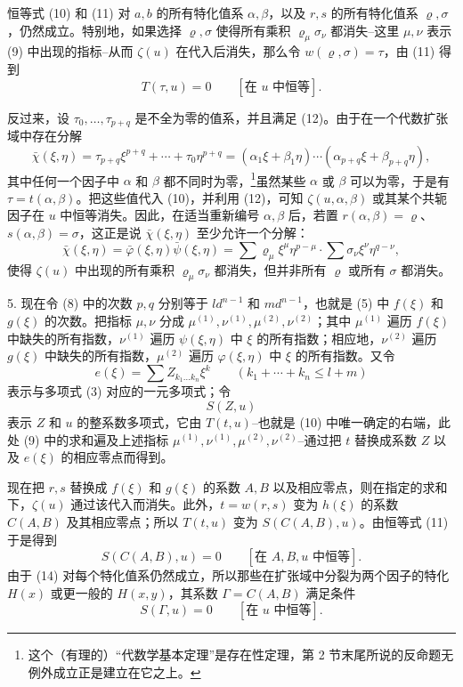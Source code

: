 恒等式 (10) 和 (11) 对 $a,b$ 的所有特化值系 $\alpha,\beta$，以及 $r,s$ 的所有特化值系 $\varrho,\sigma$，仍然成立。特别地，如果选择 $\varrho,\sigma$ 使得所有乘积 $\varrho_\mu\sigma_\nu$ 都消失--这里 $\mu,\nu$ 表示 (9) 中出现的指标--从而 $\zeta(u)$ 在代入后消失，那么令 $w(\varrho,\sigma)=\tau$，由 (11) 得到
\begin{equation}
 T(\tau,u)=0\qquad[\text{在 }u\text{ 中恒等}].
\tag{12}
\end{equation}

反过来，设 $\tau_0,\ldots,\tau_{p+q}$ 是不全为零的值系，并且满足 (12)。由于在一个代数扩张域中存在分解
\begin{equation}
 \bar\chi(\xi,\eta)=\tau_{p+q}\xi^{p+q}+\cdots+\tau_0\eta^{p+q}
=(\alpha_1\xi+\beta_1\eta)\cdots(\alpha_{p+q}\xi+\beta_{p+q}\eta),
\tag{12'}
\end{equation}
其中任何一个因子中 $\alpha$ 和 $\beta$ 都不同时为零，\footnote{这个（有理的）“代数学基本定理”是存在性定理，第 2 节末尾所说的反命题无例外成立正是建立在它之上。}虽然某些 $\alpha$ 或 $\beta$ 可以为零，于是有 $\tau=t(\alpha,\beta)$。把这些值代入 (10)，并利用 (12)，可知 $\zeta(u,\alpha,\beta)$ 或其某个共轭因子在 $u$ 中恒等消失。因此，在适当重新编号 $\alpha,\beta$ 后，若置 $r(\alpha,\beta)=\varrho$、$s(\alpha,\beta)=\sigma$，这正是说 $\bar\chi(\xi,\eta)$ 至少允许一个分解：
\begin{equation}
\bar\chi(\xi,\eta)=\bar\varphi(\xi,\eta)\bar\psi(\xi,\eta)
=\sum \varrho_\mu\xi^\mu\eta^{p-\mu}\cdot\sum \sigma_\nu\xi^\nu\eta^{q-\nu},
\tag{13}
\end{equation}
使得 $\zeta(u)$ 中出现的所有乘积 $\varrho_\mu\sigma_\nu$ 都消失，但并非所有 $\varrho$ 或所有 $\sigma$ 都消失。

5. 现在令 (8) 中的次数 $p,q$ 分别等于 $ld^{n-1}$ 和 $md^{n-1}$，也就是 (5) 中 $f(\xi)$ 和 $g(\xi)$ 的次数。把指标 $\mu,\nu$ 分成 $\mu^{(1)},\nu^{(1)},\mu^{(2)},\nu^{(2)}$；其中 $\mu^{(1)}$ 遍历 $f(\xi)$ 中缺失的所有指数，$\nu^{(1)}$ 遍历 $\psi(\xi,\eta)$ 中 $\xi$ 的所有指数；相应地，$\nu^{(2)}$ 遍历 $g(\xi)$ 中缺失的所有指数，$\mu^{(2)}$ 遍历 $\varphi(\xi,\eta)$ 中 $\xi$ 的所有指数。又令
\[
 e(\xi)=\sum Z_{k_1\ldots k_n}\xi^k\qquad(k_1+\cdots+k_n\le l+m)
\]
表示与多项式 (3) 对应的一元多项式；令
\[
 S(Z,u)
\]
表示 $Z$ 和 $u$ 的整系数多项式，它由 $T(t,u)$--也就是 (10) 中唯一确定的右端，此处 (9) 中的求和遍及上述指标 $\mu^{(1)},\nu^{(1)},\mu^{(2)},\nu^{(2)}$--通过把 $t$ 替换成系数 $Z$ 以及 $e(\xi)$ 的相应零点而得到。

现在把 $r,s$ 替换成 $f(\xi)$ 和 $g(\xi)$ 的系数 $A,B$ 以及相应零点，则在指定的求和下，$\zeta(u)$ 通过该代入而消失。此外，$t=w(r,s)$ 变为 $h(\xi)$ 的系数 $C(A,B)$ 及其相应零点；所以 $T(t,u)$ 变为 $S(C(A,B),u)$。由恒等式 (11) 于是得到
\begin{equation}
 S(C(A,B),u)=0\qquad[\text{在 }A,B,u\text{ 中恒等}].
\tag{14}
\end{equation}
由于 (14) 对每个特化值系仍然成立，所以那些在扩张域中分裂为两个因子的特化 $H(x)$ 或更一般的 $H(x,y)$，其系数 $\Gamma=C(A,B)$ 满足条件
\begin{equation}
 S(\Gamma,u)=0\qquad[\text{在 }u\text{ 中恒等}].
\tag{15}
\end{equation}

